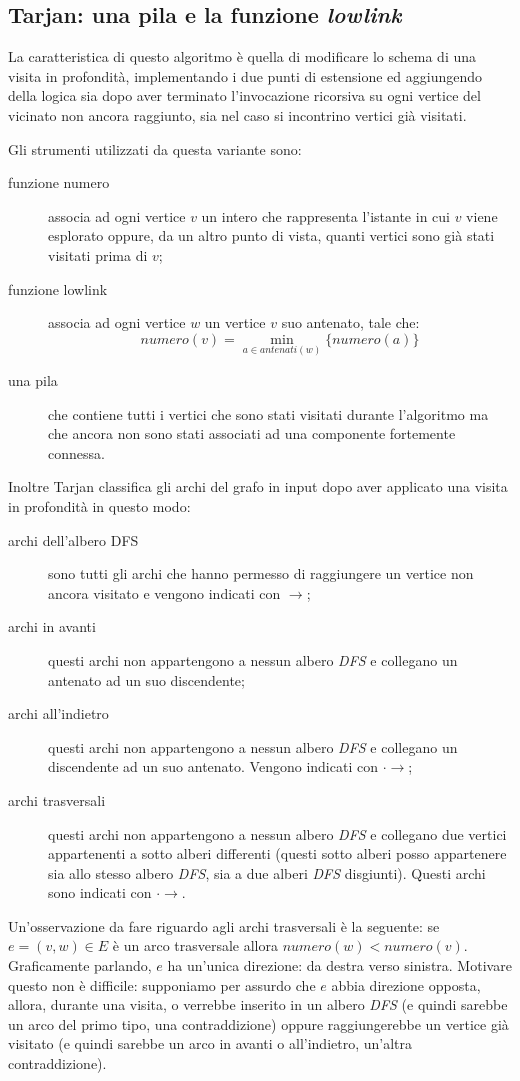 \subsection{Tarjan: una pila e la funzione \emph{lowlink}}
\label{subsection:tarjan-algorithm}
La caratteristica di questo algoritmo \`e quella di modificare lo
schema di una visita in profondit\`a, implementando i due punti di
estensione ed aggiungendo della logica sia dopo aver terminato
l'invocazione ricorsiva su ogni vertice del vicinato non ancora
raggiunto, sia nel caso si incontrino vertici gi\`a visitati.

Gli strumenti utilizzati da questa variante sono:
\begin{description}
\item[funzione numero] associa ad ogni vertice $v$ un intero che
  rappresenta l'istante in cui $v$ viene esplorato oppure, da un altro
  punto di vista, quanti vertici sono gi\`a stati visitati prima di
  $v$;
\item[funzione lowlink] associa ad ogni vertice $w$ un vertice $v$ suo
  antenato, tale che:
  \begin{displaymath}
    numero(v) = \min_{a \in antenati(w)}\{numero(a)\}
\end{displaymath}
\item[una pila] che contiene tutti i vertici che sono stati visitati
  durante l'algoritmo ma che ancora non sono stati associati ad una
  componente fortemente connessa.
\end{description}

Inoltre Tarjan classifica gli archi del grafo in input dopo aver
applicato una visita in profondit\`a in questo modo:
\begin{description}
\item[archi dell'albero DFS] sono tutti gli archi che hanno permesso
  di raggiungere un vertice non ancora visitato e vengono indicati con
  $\rightarrow$;
\item[archi in avanti] questi archi non appartengono a nessun albero
  \emph{DFS} e collegano un antenato ad un suo discendente;
\item[archi all'indietro] questi archi non appartengono a nessun
  albero \emph{DFS} e collegano un discendente ad un suo antenato.
  Vengono indicati con $\cdot\rightarrow$;
\item[archi trasversali] questi archi non appartengono a nessun albero
  \emph{DFS} e collegano due vertici appartenenti a sotto alberi
  differenti (questi sotto alberi posso appartenere sia allo stesso
  albero \emph{DFS}, sia a due alberi \emph{DFS} disgiunti). Questi
  archi sono indicati con $\cdot\rightarrow$.
\end{description}
Un'osservazione da fare riguardo agli archi trasversali \`e la
seguente: se $e = (v, w) \in E$ \`e un arco trasversale allora
$numero(w) < numero(v)$. Graficamente parlando, $e$ ha un'unica
direzione: da destra verso sinistra. Motivare questo non \`e
difficile: supponiamo per assurdo che $e$ abbia direzione opposta,
allora, durante una visita, o verrebbe inserito in un albero
\emph{DFS} (e quindi sarebbe un arco del primo tipo, una
contraddizione) oppure raggiungerebbe un vertice gi\`a visitato (e
quindi sarebbe un arco in avanti o all'indietro, un'altra
contraddizione).

